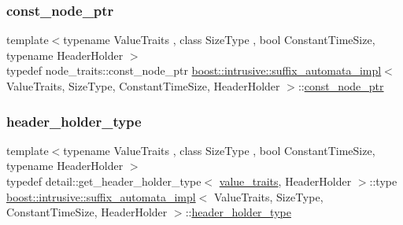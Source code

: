 \mbox{\label{classboost_1_1intrusive_1_1suffix__automata__impl_acf5340d09b102d7fa183bcb304e96d0b}} 
\subsubsection{\texorpdfstring{const\+\_\+node\+\_\+ptr}{const\_node\_ptr}}
{\footnotesize\ttfamily template$<$typename Value\+Traits , class Size\+Type , bool Constant\+Time\+Size, typename Header\+Holder $>$ \\
typedef node\+\_\+traits\+::const\+\_\+node\+\_\+ptr \hyperlink{classboost_1_1intrusive_1_1suffix__automata__impl}{boost\+::intrusive\+::suffix\+\_\+automata\+\_\+impl}$<$ Value\+Traits, Size\+Type, Constant\+Time\+Size, Header\+Holder $>$\+::\hyperlink{classboost_1_1intrusive_1_1suffix__automata__impl_acf5340d09b102d7fa183bcb304e96d0b}{const\+\_\+node\+\_\+ptr}}

\mbox{\label{classboost_1_1intrusive_1_1suffix__automata__impl_a0b9a7a78415c25b6b3f377e1269f539a}} 
\subsubsection{\texorpdfstring{header\+\_\+holder\+\_\+type}{header\_holder\_type}}
{\footnotesize\ttfamily template$<$typename Value\+Traits , class Size\+Type , bool Constant\+Time\+Size, typename Header\+Holder $>$ \\
typedef detail\+::get\+\_\+header\+\_\+holder\+\_\+type$<$ \hyperlink{classboost_1_1intrusive_1_1suffix__automata__impl_abbf3dee8caf18613db903931801c6076}{value\+\_\+traits}, Header\+Holder $>$\+::type \hyperlink{classboost_1_1intrusive_1_1suffix__automata__impl}{boost\+::intrusive\+::suffix\+\_\+automata\+\_\+impl}$<$ Value\+Traits, Size\+Type, Constant\+Time\+Size, Header\+Holder $>$\+::\hyperlink{classboost_1_1intrusive_1_1suffix__automata__impl_a0b9a7a78415c25b6b3f377e1269f539a}{header\+\_\+holder\+\_\+type}}

